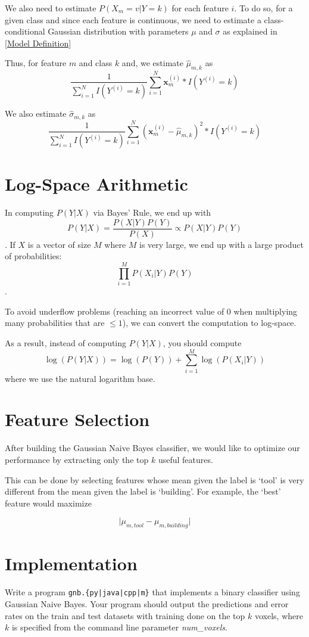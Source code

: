\documentclass[11pt,addpoints,answers]{exam}
\begin{document}
We also need to estimate $P(X_m = v| Y = k)$ for each feature $i$. To do so, for a given class and since each feature is continuous, we need to estimate a class-conditional Gaussian distribution with parameters $\mu$ and $\sigma$ as explained in \ref{Model Definition}


Thus, for feature $m$ and class $k$ and, we estimate $\hat{\mu}_{m,k}$ as $$\frac{1}{\sum_{i=1}^{N} I(Y^{(i)} = k)} \sum_{i=1}^{N} \mathbf{x}^{(i)}_m * I (Y^{(i)} = k)$$

We also estimate $\hat{\sigma}_{m,k}$ as $$\frac{1}{\sum_{i=1}^{N} I(Y^{(i)} = k)} \sum_{i=1}^{N} (\mathbf{x}^{(i)}_m - \hat{\mu}_{m,k})^2*I (Y^{(i)} = k)$$

\section{Log-Space Arithmetic}

In computing $P(Y|X)$ via Bayes' Rule, we end up with $$P(Y|X) = \frac{P(X|Y)P(Y)}{P(X)} \propto P(X|Y)P(Y)$$. If $X$ is a vector of size $M$ where $M$ is very large, we end up with a large product of probabilities: $$\prod_{i=1}^{M} P(X_i|Y) P(Y)$$.

To avoid underflow problems (reaching an incorrect value of 0 when multiplying many probabilities that are $\leq 1$), we can convert the computation to log-space. 

As a result, instead of computing $P(Y|X)$, you should compute $$\log(P(Y|X)) = \log(P(Y)) + \sum_{i=1}^{M} \log(P(X_i|Y))$$ where we use the natural logarithm base. 

\section{Feature Selection}
\label{features}

After building the Gaussian Naive Bayes classifier, we would like to optimize our performance by extracting only the top $k$ useful features.

This can be done by selecting features whose mean given the label is `tool' is very different from the mean given the label is `building'. For example, the `best' feature would maximize

       $$ \lvert \mu_{m,tool} - \mu_{m,building} \rvert $$
       
       
\section{Implementation}
Write a program \texttt{gnb.\{py|java|cpp|m\}} that implements a binary classifier using Gaussian Naive Bayes. Your program should output the predictions and error rates on the train and test datasets with training done on the top $k$ voxels, where $k$ is specified from the command line parameter \textit{num\_voxels}. 
\end{document}
